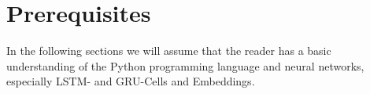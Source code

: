 \section{Prerequisites}
\label{sec:prerequisites}

  In the following sections we will assume that the reader has a basic understanding
  of the Python programming language and neural networks, especially LSTM- and GRU-Cells
  and Embeddings.
